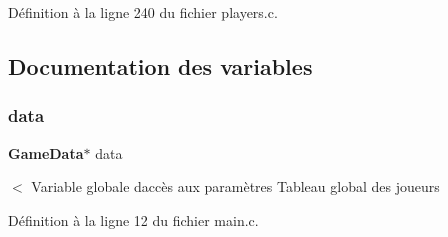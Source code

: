Définition à la ligne 240 du fichier players.\+c.



\subsection{Documentation des variables}
\mbox{\label{players_8c_a882ad77a7df764b098f98136eb56a83a}} 
\subsubsection{data}
{\footnotesize\ttfamily \textbf{ Game\+Data}$\ast$ data}

$<$ Variable globale d\textquotesingle{}accès aux paramètres Tableau global des joueurs 

Définition à la ligne 12 du fichier main.\+c.

